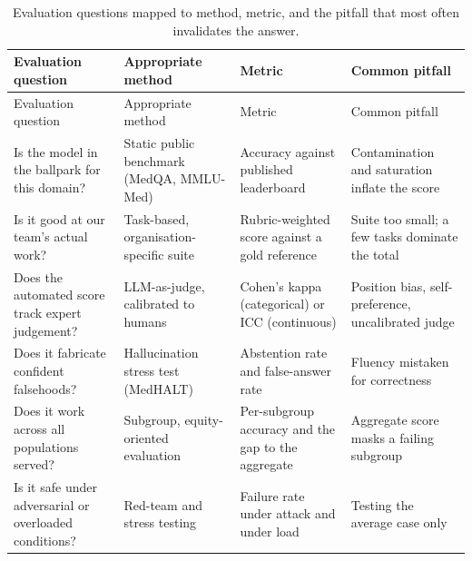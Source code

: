 \documentclass[
  letterpaper,
  11pt]{scrbook}
\begin{document}
\begin{longtable}[]{@{}
  >{\raggedright\arraybackslash}p{}
  >{\raggedright\arraybackslash}p{}
  >{\raggedright\arraybackslash}p{}
  >{\raggedright\arraybackslash}p{}@{}}
\caption{Evaluation questions mapped to method, metric, and the pitfall
that most often invalidates the
answer.}\label{tbl-eval-map}\tabularnewline
\toprule\noalign{}
\begin{minipage}[b]{\linewidth}\raggedright
Evaluation question
\end{minipage} & \begin{minipage}[b]{\linewidth}\raggedright
Appropriate method
\end{minipage} & \begin{minipage}[b]{\linewidth}\raggedright
Metric
\end{minipage} & \begin{minipage}[b]{\linewidth}\raggedright
Common pitfall
\end{minipage} \\
\midrule\noalign{}
\endfirsthead
\toprule\noalign{}
\begin{minipage}[b]{\linewidth}\raggedright
Evaluation question
\end{minipage} & \begin{minipage}[b]{\linewidth}\raggedright
Appropriate method
\end{minipage} & \begin{minipage}[b]{\linewidth}\raggedright
Metric
\end{minipage} & \begin{minipage}[b]{\linewidth}\raggedright
Common pitfall
\end{minipage} \\
\midrule\noalign{}
\endhead
\bottomrule\noalign{}
\endlastfoot
Is the model in the ballpark for this domain? & Static public benchmark
(MedQA, MMLU-Med) & Accuracy against published leaderboard &
Contamination and saturation inflate the score \\
Is it good at our team's actual work? & Task-based,
organisation-specific suite & Rubric-weighted score against a gold
reference & Suite too small; a few tasks dominate the total \\
Does the automated score track expert judgement? & LLM-as-judge,
calibrated to humans & Cohen's kappa (categorical) or ICC (continuous) &
Position bias, self-preference, uncalibrated judge \\
Does it fabricate confident falsehoods? & Hallucination stress test
(MedHALT) & Abstention rate and false-answer rate & Fluency mistaken for
correctness \\
Does it work across all populations served? & Subgroup, equity-oriented
evaluation & Per-subgroup accuracy and the gap to the aggregate &
Aggregate score masks a failing subgroup \\
Is it safe under adversarial or overloaded conditions? & Red-team and
stress testing & Failure rate under attack and under load & Testing the
average case only \\
\end{longtable}
\end{document}
